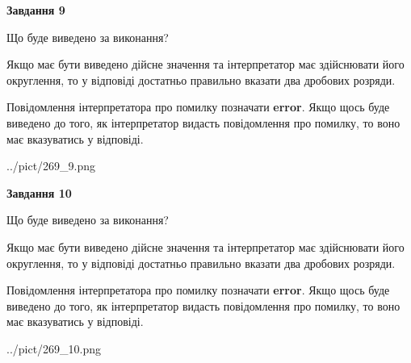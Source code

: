 \documentclass[12pt, ukrainian]{article}
\begin{document}
{\begin {Large}
{\begin {center}\textbf{Завдання 9}\end {center}}\par
Що буде виведено за виконання? \par

Якщо має бути виведено дійсне значення та інтерпретатор має здійснювати його округлення, 
то у відповіді достатньо правильно вказати два дробових розряди.

Повідомлення інтерпретатора про помилку позначати \textbf{error}.
Якщо щось буде виведено до того, як інтерпретатор видасть повідомлення про помилку, 
то воно має вказуватись у відповіді. \par

\begin{center}
	{../pict/269_9.png}
\end{center}
\newpage

{\begin {center}\textbf{Завдання 10}\end {center}}\par
Що буде виведено за виконання? \par

Якщо має бути виведено дійсне значення та інтерпретатор має здійснювати його округлення, 
то у відповіді достатньо правильно вказати два дробових розряди.

Повідомлення інтерпретатора про помилку позначати \textbf{error}.
Якщо щось буде виведено до того, як інтерпретатор видасть повідомлення про помилку, 
то воно має вказуватись у відповіді. \par

\begin{center}
	{../pict/269_10.png}
\end{center}
\newpage

\end {Large}}
\end{document}

